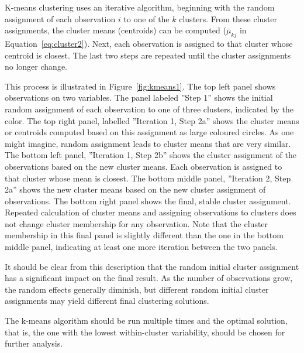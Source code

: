 K-means clustering uses an iterative algorithm, beginning with the random assignment of each observation $i$ to one of the $k$ clusters. From these cluster assignments, the cluster means (centroids) can be computed ($\bar{\mu}_{kj}$ in Equation~\ref{eq:cluster2}). Next, each observation is assigned to that cluster whose centroid is closest. The last two steps are repeated until the cluster assignments no longer change. 

This process is illustrated in Figure~\ref{fig:kmeans1}. The top left panel shows observations on two variables. The panel labeled ''Step 1'' shows the initial random assignment of each observation to one of three clusters, indicated by the color. The top right panel, labelled ''Iteration 1, Step 2a'' shows the cluster means or centroids computed based on this assignment as large coloured circles. As one might imagine, random assignment leads to cluster means that are very similar. The bottom left panel, ''Iteration 1, Step 2b'' shows the cluster assignment of the observations based on the new cluster means. Each observation is assigned to that cluster whose mean is closest. The bottom middle panel, ''Iteration 2, Step 2a'' shows the new cluster means based on the new cluster assignment of observations. The bottom right panel shows the final, stable cluster assignment. Repeated calculation of cluster means and assigning observations to clusters does not change cluster membership for any observation. Note that the cluster membership in this final panel is slightly different than the one in the bottom middle panel, indicating at least one more iteration between the two panels. 

It should be clear from this description that the random initial cluster assignment has a significant impact on the final result. As the number of observations grow, the random effects generally diminish, but different random initial cluster assignments may yield different final clustering solutions. 

\begin{tcolorbox}[colback=alert]
\noindent The k-means algorithm should be run multiple times and the optimal solution, that is, the one with the lowest within-cluster variability, should be chosen for further analysis.
\end{tcolorbox}


